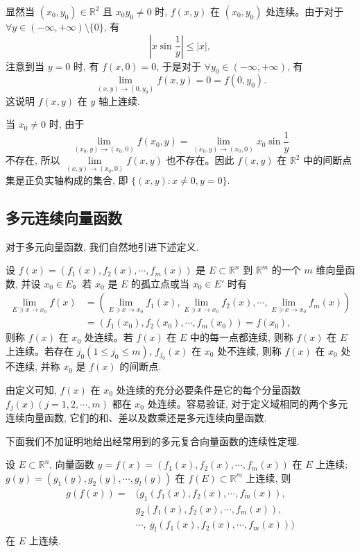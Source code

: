 \begin{solve}
显然当 $(x_0,y_0)\in\mathbb R^2$ 且 $x_0y_0\ne0$ 时, $f(x,y)$ 在 $(x_0,y_0)$ 处连续。由于对于 $\forall y\in(-\infty,+\infty)\setminus\{0\}$, 有
\[
  \left|x\sin\frac1y\right|\leqslant |x|,
\]
注意到当 $y=0$ 时, 有 $f(x,0)=0$, 于是对于 $\forall y_0\in(-\infty,+\infty)$, 有
\[
  \lim_{(x,y)\to(0,y_0)}f(x,y)=0=f(0,y_0).
\]
这说明 $f(x,y)$ 在 $y$ 轴上连续.

当 $x_0\ne0$ 时, 由于
\[
  \lim_{(x_0,y)\to(x_0,0)}f(x_0,y)
  =\lim_{(x_0,y)\to(x_0,0)}x_0\sin\frac1y
\]
不存在, 所以 $\lim\limits_{(x,y)\to(x_0,0)}f(x,y)$ 也不存在。因此 $f(x,y)$ 在 $\mathbb R^2$ 中的间断点集是正负实轴构成的集合, 即 $\{(x,y):x\ne0,y=0\}$.
\end{solve}


\subsection{多元连续向量函数}
\label{subsec:ma-13-3-2}

对于多元向量函数, 我们自然地引进下述定义.

\begin{definition}\label{definition:ma-13-3-2}
设 $f(x)=(f_1(x),f_2(x),\cdots,f_m(x))$ 是 $E\subset\mathbb R^n$ 到 $\mathbb R^m$ 的一个 $m$ 维向量函数, 并设 $x_0\in E$。若 $x_0$ 是 $E$ 的孤立点或当 $x_0\in E'$ 时有
\[
\begin{aligned}
  \lim_{E\ni x\to x_0}f(x)
  &=
  \left(\lim_{E\ni x\to x_0}f_1(x),
  \lim_{E\ni x\to x_0}f_2(x),
  \cdots,\lim_{E\ni x\to x_0}f_m(x)\right)\\
  &=(f_1(x_0),f_2(x_0),\cdots,f_m(x_0))=f(x_0),
\end{aligned}
\]
则称 $f(x)$ 在 $x_0$ 处连续。若 $f(x)$ 在 $E$ 中的每一点都连续, 则称 $f(x)$ 在 $E$ 上连续。若存在 $j_0(1\leqslant j_0\leqslant m)$, $f_{j_0}(x)$ 在 $x_0$ 处不连续, 则称 $f(x)$ 在 $x_0$ 处不连续, 并称 $x_0$ 是 $f(x)$ 的间断点.
\end{definition}

由定义可知, $f(x)$ 在 $x_0$ 处连续的充分必要条件是它的每个分量函数 $f_j(x)(j=1,2,\cdots,m)$ 都在 $x_0$ 处连续。容易验证, 对于定义域相同的两个多元连续向量函数, 它们的和、差以及数乘还是多元连续向量函数.

下面我们不加证明地给出经常用到的多元复合向量函数的连续性定理.

\begin{theorem}\label{theorem:ma-13-3-1}
设 $E\subset\mathbb R^n$, 向量函数 $y=f(x)=(f_1(x),f_2(x),\cdots,f_m(x))$ 在 $E$ 上连续; $g(y)=(g_1(y),g_2(y),\cdots,g_l(y))$ 在 $f(E)\subset\mathbb R^m$ 上连续, 则
\[
\begin{aligned}
  g(f(x))={}&(g_1(f_1(x),f_2(x),\cdots,f_m(x)),\\
  &g_2(f_1(x),f_2(x),\cdots,f_m(x)),\\
  &\cdots,\ g_l(f_1(x),f_2(x),\cdots,f_m(x)))
\end{aligned}
\]
在 $E$ 上连续.
\end{theorem}


